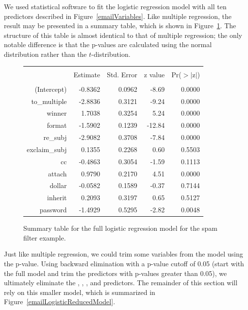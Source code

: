 We used statistical software to fit the logistic regression model with all ten predictors described in Figure~\ref{emailVariables}. Like multiple regression, the result may be presented in a summary table, which is shown in Figure~\ref{emailLogisticModelResults}. The structure of this table is almost identical to that of multiple regression; the only notable difference is that the p-values are calculated using the normal distribution rather than the $t$-distribution.

\begin{figure}[ht]
\centering
\begin{tabular}{rrrrr}
  \hline
  \vspace{-3.7mm} & & & & \\
 & Estimate & Std. Error & z value & Pr($>$$|$z$|$) \\ 
  \hline
  \vspace{-3.8mm} & & & & \\
(Intercept) & -0.8362 & 0.0962 & -8.69 & 0.0000 \\ 
  to\_\hspace{0.3mm}multiple & -2.8836 & 0.3121 & -9.24 & 0.0000 \\ 
  winner & 1.7038 & 0.3254 & 5.24 & 0.0000 \\ 
  format & -1.5902 & 0.1239 & -12.84 & 0.0000 \\ 
  re\_\hspace{0.3mm}subj & -2.9082 & 0.3708 & -7.84 & 0.0000 \\ 
  exclaim\_\hspace{0.3mm}subj & 0.1355 & 0.2268 & 0.60 & 0.5503 \\ 
  cc & -0.4863 & 0.3054 & -1.59 & 0.1113 \\ 
  attach & 0.9790 & 0.2170 & 4.51 & 0.0000 \\ 
  dollar & -0.0582 & 0.1589 & -0.37 & 0.7144 \\ 
  inherit & 0.2093 & 0.3197 & 0.65 & 0.5127 \\ 
  password & -1.4929 & 0.5295 & -2.82 & 0.0048 \\ 
\hline
\end{tabular}
\caption{Summary table for the full logistic regression model for the spam filter example.}
\label{emailLogisticModelResults}
\end{figure}

Just like multiple regression, we could trim some variables from the model using the p-value. Using backward elimination with a p-value cutoff of 0.05 (start with the full model and trim the predictors with p-values greater than 0.05), we ultimately eliminate the , , , and  predictors. The remainder of this section will rely on this smaller model, which is summarized in Figure~\ref{emailLogisticReducedModel}.

